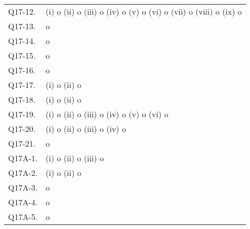 \documentclass[uplatex,dvipdfmx,a4paper,11pt]{jlreq}
\theoremstyle{definition}
\begin{document}
\begin{table}[hbtp]
\begin{tabular}{ll}
    Q17-12.  & (i) o (ii) o (iii) o (iv) o (v) o (vi) o (vii) o (viii) o (ix) o                                                      \\
    Q17-13.  & o                                                                                                                     \\
    Q17-14.  & o                                                                                                                     \\
    Q17-15.  & o                                                                                                                     \\
    Q17-16.  & o                                                                                                                     \\
    Q17-17.  & (i) o (ii) o                                                                                                          \\
    Q17-18.  & (i) o (ii) o                                                                                                          \\
    Q17-19.  & (i) o (ii) o (iii) o (iv) o (v) o (vi) o                                                                              \\
    Q17-20.  & (i) o (ii) o (iii) o (iv) o                                                                                           \\
    Q17-21.  & o                                                                                                                     \\
    Q17A-1.  & (i) o (ii) o (iii) o                                                                                                  \\
    Q17A-2.  & (i) o (ii) o                                                                                                          \\
    Q17A-3.  & o                                                                                                                     \\
    Q17A-4.  & o                                                                                                                     \\
    Q17A-5.  & o                                                                                                                     \\

\end{tabular}
\end{table}
\end{document}
